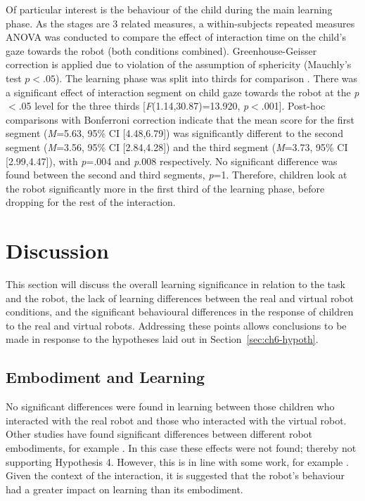 Of particular interest is the behaviour of the child during the main learning phase. As the stages are 3 related measures, a within-subjects repeated measures ANOVA was conducted to compare the effect of interaction time on the child's gaze towards the robot (both conditions combined). Greenhouse-Geisser correction is applied due to violation of the assumption of sphericity (Mauchly's test $\textit{p}<.05$). The learning phase was split into thirds for comparison \citep{baxter2014tracking}. There was a significant effect of interaction segment on child gaze towards the robot at the \textit{p}$<$.05 level for the three thirds [\textit{F}(1.14,30.87)=13.920, \textit{p}$<$.001]. Post-hoc comparisons with Bonferroni correction indicate that the mean score for the first segment (\textit{M}=5.63, 95\% CI [4.48,6.79]) was significantly different to the second segment (\textit{M}=3.56, 95\% CI [2.84,4.28]) and the third segment (\textit{M}=3.73, 95\% CI [2.99,4.47]), with \textit{p}=.004 and \textit{p}.008 respectively. No significant difference was found between the second and third segments, \textit{p}=1. Therefore, children look at the robot significantly more in the first third of the learning phase, before dropping for the rest of the interaction.

\section{Discussion} \label{sec:ch6-embodiment-discussion}
This section will discuss the overall learning significance in relation to the task and the robot, the lack of learning differences between the real and virtual robot conditions, and the significant behavioural differences in the response of children to the real and virtual robots. Addressing these points allows conclusions to be made in response to the hypotheses laid out in Section~\ref{sec:ch6-hypoth}.

\subsection{Embodiment and Learning}\label{sec:ch6-disc-learning}
No significant differences were found in learning between those children who interacted with the real robot and those who interacted with the virtual robot. Other studies have found significant differences between different robot embodiments, for example \cite{huang2013modeling, leyzberg2012physical}. In this case these effects were not found; thereby not supporting Hypothesis 4. However, this is in line with some work, for example \cite{hasegawa2010role}. Given the context of the interaction, it is suggested that the robot's behaviour had a greater impact on learning than its embodiment.

